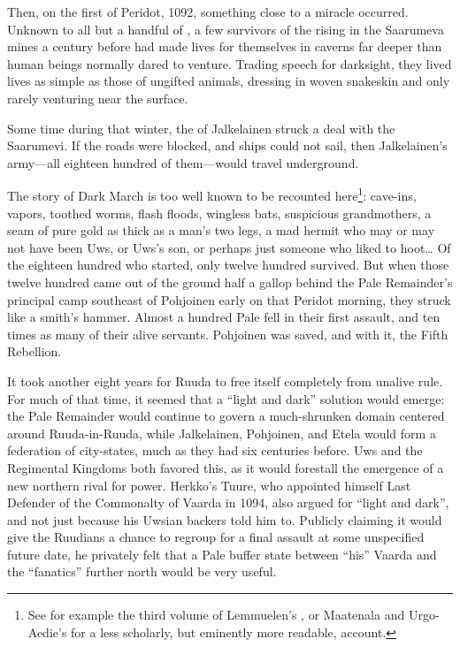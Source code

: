 \documentclass[12pt]{report}
\begin{document}
Then, on the first of Peridot, 1092, something close to a miracle
occurred.  Unknown to all but a handful of {\aemott}, a few survivors
of the rising in the Saarumeva mines a century before had made lives
for themselves in caverns far deeper than human beings normally dared
to venture.  Trading speech for darksight, they lived lives as simple
as those of ungifted animals, dressing in woven snakeskin and only
rarely venturing near the surface.

Some time during that winter, the {\aemott} of Jalkelainen struck a
deal with the Saarumevi.  If the roads were blocked, and ships could
not sail, then Jalkelainen's army---all eighteen hundred of
them---would travel underground.

The story of Dark March is too well known to be recounted
here\footnote{See for example the third volume of Lemmuelen's
, or Maatenala and
Urgo-Aedie's  for a less scholarly, but
eminently more readable, account.}: cave-ins, vapors, toothed worms,
flash floods, wingless bats, suspicious grandmothers, a seam of pure
gold as thick as a man's two legs, a mad hermit who may or may not
have been Uws, or Uws's son, or perhaps just someone who liked to
hoot{\ldots} Of the eighteen hundred who started, only twelve hundred
survived.  But when those twelve hundred came out of the ground half a
gallop behind the Pale Remainder's principal camp southeast of
Pohjoinen early on that Peridot morning, they struck like a smith's
hammer.  Almost a hundred Pale fell in their first assault, and ten
times as many of their alive servants.  Pohjoinen was saved, and with
it, the Fifth Rebellion.

It took another eight years for Ruuda to free itself completely from
unalive rule.  For much of that time, it seemed that a ``light and
dark'' solution would emerge: the Pale Remainder would continue to
govern a much-shrunken domain centered around Ruuda-in-Ruuda, while
Jalkelainen, Pohjoinen, and Etela would form a federation of
city-states, much as they had six centuries before.  Uws and the
Regimental Kingdoms both favored this, as it would forestall the
emergence of a new northern rival for power.  Herkko's Tuure, who
appointed himself Last Defender of the Commonalty of Vaarda in 1094,
also argued for ``light and dark'', and not just because his Uwsian
backers told him to.  Publicly claiming it would give the Ruudians a
chance to regroup for a final assault at some unspecified future date,
he privately felt that a Pale buffer state between ``his'' Vaarda and
the ``fanatics'' further north would be very useful.
\end{document}
